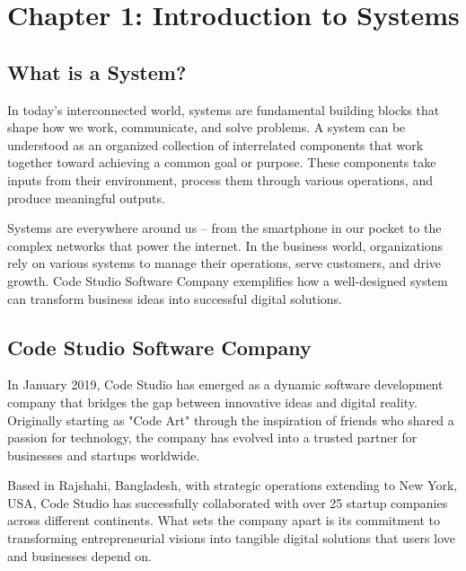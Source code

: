 \documentclass[12pt,a4paper]{article}
\begin{document}
\pagestyle{reportstyle}
\newpage

\renewcommand{\contentsname}{Table of Contents}
\tableofcontents
\newpage


\section{Chapter 1: Introduction to Systems}

\vspace{0.2cm}

\subsection{What is a System?}

In today's interconnected world, systems are fundamental building blocks that shape how we work, communicate, and solve problems. A system can be understood as an organized collection of interrelated components that work together toward achieving a common goal or purpose. These components take inputs from their environment, process them through various operations, and produce meaningful outputs.

Systems are everywhere around us – from the smartphone in our pocket to the complex networks that power the internet. In the business world, organizations rely on various systems to manage their operations, serve customers, and drive growth. Code Studio Software Company exemplifies how a well-designed system can transform business ideas into successful digital solutions.

\subsection{Code Studio Software Company}

In January 2019, Code Studio has emerged as a dynamic software development company that bridges the gap between innovative ideas and digital reality. Originally starting as "Code Art" through the inspiration of friends who shared a passion for technology, the company has evolved into a trusted partner for businesses and startups worldwide.

Based in Rajshahi, Bangladesh, with strategic operations extending to New York, USA, Code Studio has successfully collaborated with over 25 startup companies across different continents. What sets the company apart is its commitment to transforming entrepreneurial visions into tangible digital solutions that users love and businesses depend on.
\end{document}
